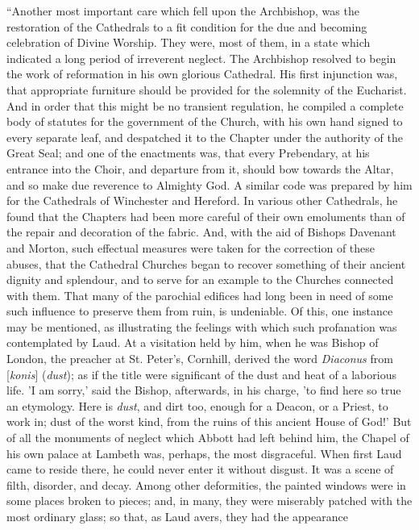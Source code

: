 ``Another most important care which
fell upon the Archbishop, was the restoration of the Cathedrals to a fit
condition for the due and becoming celebration of Divine Worship. They
were, most of them, in a state which indicated a long period of
irreverent neglect. The Archbishop resolved to begin the work of
reformation in his own glorious Cathedral. His first injunction was,
that appropriate furniture should be provided for the solemnity of the
Eucharist. And in order that this might be no transient regulation, he
compiled a complete body of statutes for the government of the Church,
with his own hand signed to every separate leaf, and despatched it to
the Chapter under the authority of the Great Seal; and one of the
enactments was, that every Prebendary, at his entrance into the Choir,
and departure from it, should bow towards the Altar, and so make due
reverence to Almighty God. A similar code was prepared by him for the
Cathedrals of Winchester and Hereford. In various other Cathedrals, he
found that the Chapters had been more careful of their own emoluments
than of the repair and decoration of the fabric.
And, with the aid of Bishops Davenant and Morton, such effectual
measures were taken for the correction of these abuses, that the
Cathedral Churches began to recover something of their ancient dignity
and splendour, and to serve for an example to the Churches connected
with them. That many of the parochial edifices had long been in need of
some such influence to preserve them from ruin, is undeniable. Of this,
one instance may be mentioned, as illustrating the feelings with which
such profanation was contemplated by Laud. At a visitation held by him,
when he was Bishop of London, the preacher at St. Peter's, Cornhill,
derived the word \emph{Diaconus} from [\emph{konis}] (\emph{dust}); as
if the title were significant of the dust and heat of a laborious life. 'I
am sorry,' said the Bishop, afterwards, in his charge, 'to find here so
true an etymology. Here is \emph{dust}, and dirt too, enough for a
Deacon, or a Priest, to work in; dust of the worst kind, from the ruins
of this ancient House of God!' But of all the monuments of neglect which
Abbott had left behind him, the Chapel of his own palace at Lambeth was,
perhaps, the most disgraceful. When first Laud came to reside there, he
could never enter it without disgust. It was a scene of filth, disorder,
and decay. Among other deformities, the painted windows were in some
places broken to pieces; and, in many, they were miserably patched with
the most ordinary glass; so that, as Laud avers, they had the appearance
